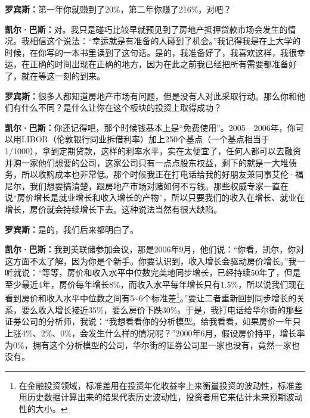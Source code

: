 \begin{BookQuote}
\textbf{罗宾斯：}第一年你就赚到了20\%，第二年你赚了216\%，对吧？
\end{BookQuote}

\begin{BookQuote}
\textbf{凯尔·巴斯：}对。我只是碰巧比较早就预见到了房地产抵押贷款市场会发生的情况。我相信这个说法：“幸运就是有准备的人碰到了机会。”我记得我是在上大学的时候，在你写的一本书里读到了这句话。是的，我准备好了，我喜欢这样，我很幸运，在正确的时间出现在正确的地方，因为在此之前我已经把所有需要都准备好了，就在等这一刻的到来。
\end{BookQuote}

\begin{BookQuote}
\textbf{罗宾斯：}很多人都知道房地产市场有问题，但是没有人对此采取行动。那么你和他们有什么不同？是什么让你在这个板块的投资上取得成功？
\end{BookQuote}

\begin{BookQuote}
\textbf{凯尔·巴斯：}你还记得吧，那个时候钱基本上是“免费使用”。2005—2006年，你可以用LIBOR（伦敦银行同业拆借利率）加上250个基点（一个基点相当于1/1000），拿到定期贷款，这样的利率水平，实在太便宜了，任何人都可以去融资并购一家他们想要的公司，这家公司只有一点点股东权益，剩下的就是一大堆债务，所以收购成本也非常低。那个时候我正在打电话给我的好朋友兼同事艾伦·福尼尔，我们想要搞清楚，跟房地产市场对赌如何不亏钱。那些权威专家一直在说“房价增长是就业增长和收入增长的产物”，所以只要我们的收入在增长、就业在增长，房价就会持续增长下去。这种说法当然有很大缺陷。
\end{BookQuote}

\begin{BookQuote}
\textbf{罗宾斯：}是的，我们后来都明白了。
\end{BookQuote}

\begin{BookQuote}
\textbf{凯尔·巴斯：}我到美联储参加会议，那是2006年9月，他们说：“你看，凯尔，你对这方面不太了解，因为你是个新手。你要认识到，收入增长会驱动房价增长。”我一听就说：“等等，房价和收入水平中位数完美地同步增长，已经持续50年了，但是至少最近4年，房价每年增长8\%，而收入水平每年增长只有1.5\%，所以说我们现在看到房价和收入水平中位数之间有5\textasciitilde{}6个标准差\footnote{\label{fn:pdf-40-1}在金融投资领域，标准差用在投资年化收益率上来衡量投资的波动性，标准差用历史数据计算出来的结果代表历史波动性，投资者用它来估计未来预期波动性的大小。}。”要让二者重新回到同步增长的关系，要么收入增长接近35\%，要么房价下跌30\%。于是，我打电话给华尔街的那些证券公司的分析师，我说：“我想看看你的分析模型。给我看看，如果房价一年只上涨4\%、2\%、0\%，会发生什么样的情况呢？”2000年6月，假设房价持平，增长率为0\%，拥有这个分析模型的公司，华尔街的证券公司里一家也没有，竟然一家也没有。
\end{BookQuote}

